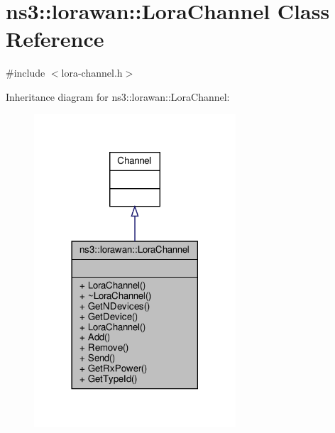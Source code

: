 \hypertarget{classns3_1_1lorawan_1_1LoraChannel}{}\section{ns3\+:\+:lorawan\+:\+:Lora\+Channel Class Reference}
\label{classns3_1_1lorawan_1_1LoraChannel}


{\ttfamily \#include $<$lora-\/channel.\+h$>$}



Inheritance diagram for ns3\+:\+:lorawan\+:\+:Lora\+Channel\+:
\nopagebreak
\begin{figure}[H]
\begin{center}
\leavevmode
\includegraphics[width=213pt]{classns3_1_1lorawan_1_1LoraChannel__inherit__graph}
\end{center}
\end{figure}



